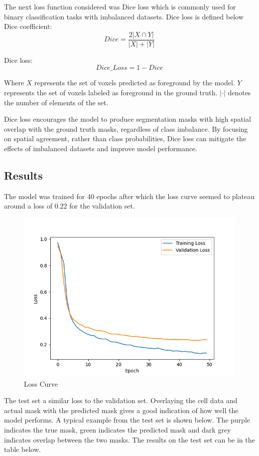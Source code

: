 \documentclass[a4]{article}
\begin{document}
The next loss function considered was Dice loss which is commonly used for binary classification tasks with imbalanced datasets. Dice loss is defined below\\

Dice coefficient:
\[ Dice = \frac{2  |X \cap Y|}{|X| + |Y|} \]

Dice loss:
\[ Dice\_Loss = 1 - Dice \]

Where \(X\) represents the set of voxels predicted as foreground by the model. \(Y\) represents the set of voxels labeled as foreground in the ground truth. \(|\cdot|\) denotes the number of elements of the set.

Dice loss encourages the model to produce segmentation masks with high spatial overlap with the ground truth masks, regardless of class imbalance. By focusing on spatial agreement, rather than class probabilities, Dice loss can mitigate the effects of imbalanced datasets and improve model performance.

\subsection{Results}
The model was trained for 40 epochs after which the loss curve seemed to plateau around a loss of 0.22 for the validation set.

\begin{figure}[h!]
    \centering
    \includegraphics{figures/Loss_curve.png}
    \caption{Loss Curve}
    \label{fig:enter-label}
\end{figure}

The test set a similar loss to the validation set. Overlaying the cell data and actual mask with the predicted mask gives a good indication of how well the model performs. A typical example from the test set is shown below. The purple indicates the true mask, green indicates the predicted mask and dark grey indicates overlap between the two masks. The results on the test set can be in the table below.
\end{document}
